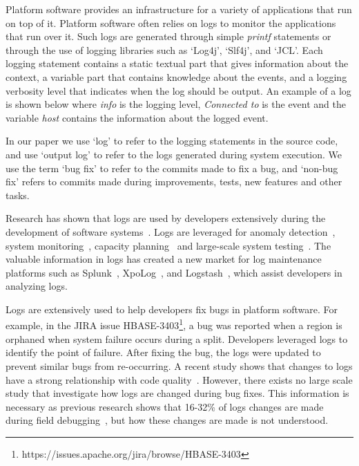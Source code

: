 Platform software provides an infrastructure for a variety of applications that run on top of it. Platform software often relies on logs to monitor the applications that run over it. Such logs are generated through simple \textsl{printf} statements or through the use of logging libraries such as `Log4j', `Slf4j', and `JCL'. Each logging statement contains a static textual part that gives information about the context,  a variable part that contains knowledge about the events, and a logging verbosity level that indicates when the log should be output. An example of a log is shown below where \emph{info} is the logging level, \emph{Connected to} is the event and the variable \emph{host} contains the information about the logged event. 


 In our paper we use `log' to refer to the logging statements in the source code, and use `output log' to refer to the logs generated during system execution. We use the term `bug fix' to refer to the commits made to fix a bug, and `non-bug fix' refers to commits made during improvements, tests, new features and other tasks.
 
Research has shown that logs are used by developers extensively during the development of software systems~\cite{Characterizinglogs}. Logs are leveraged for anomaly detection~\cite{XUanomalies,ConsoleLogs,Marksyer}, system monitoring~\cite{Bitperformance}, capacity planning~\cite{IanWCRE} and large-scale system testing~\cite{markTesting}. The valuable information in logs has created a new market for log maintenance platforms such as Splunk~\cite{Bitperformance}, XpoLog~\cite{Xpolog}, and Logstash~\cite{Logstash}, which assist developers in analyzing logs.

Logs are extensively used to help developers fix bugs in platform software. For example, in the JIRA issue HBASE-3403\footnote{https://issues.apache.org/jira/browse/HBASE-3403}, a bug was reported when a region is orphaned when system failure occurs during a split. Developers leveraged logs to identify the point of failure. After fixing the bug, the logs were updated to prevent similar bugs from re-occurring. A recent study shows that changes to logs have a strong relationship with code quality~\cite{EMSEIAN}. However, there exists no large scale study that investigate how logs are changed during bug fixes.  This information is necessary as previous research shows that 16-32\% of logs changes are made during field debugging~\cite{EMSEIAN}, but how these changes are made is not understood. 


